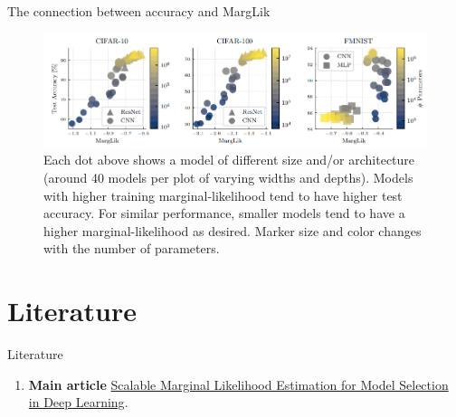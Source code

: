 \documentclass{beamer}
\begin{document}
\begin{frame}{The connection between accuracy and MargLik}
    \begin{figure}
        \centering
        \includegraphics[scale=0.6]{images/example_2.png}
        \caption{Each dot above shows a model of different size and/or architecture (around 40 models per plot of varying widths and depths). Models with higher training marginal-likelihood tend to have higher test accuracy. For similar performance, smaller models tend to have a higher marginal-likelihood as desired. Marker size and color changes with the number of parameters.}
        \label{fig:enter-label}
    \end{figure}
\end{frame}

\section{Literature}
\begin{frame}{Literature}
    \begin{enumerate}
        \item \textbf{Main article} \href{https://proceedings.mlr.press/v139/immer21a/immer21a.pdf}
        {Scalable Marginal Likelihood Estimation for Model Selection in Deep Learning}.
    \end{enumerate}
\end{frame}
\end{document}
